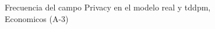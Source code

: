\begin{figure}[H]
    \centering
    
    \caption{Frecuencia del campo Privacy en el modelo real y tddpm, Economicos (A-3)}
    \label{frecuency-Privacy-tddpm_mlp}
\end{figure}